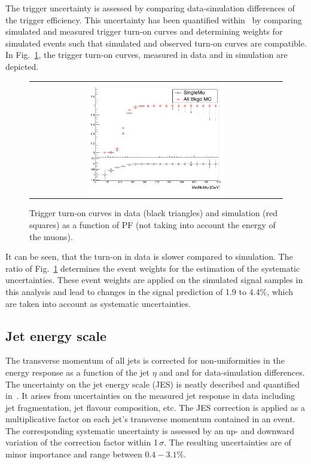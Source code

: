 The trigger uncertainty is assessed by comparing data-simulation differences of the trigger efficiency.
This uncertainty has been quantified within~\cite{bib:CMS:DT_Thesis,bib:CMS:DT_8TeV_AN} by comparing simulated and measured trigger turn-on curves and determining weights for simulated events such that simulated and observed turn-on curves are compatible.
In Fig.~\ref{fig:TriggerTurnOn}, the trigger turn-on curves, measured in data and in simulation are depicted.
\begin{figure}[!b]
  \centering 
  \begin{tabular}{c}
    \includegraphics[width=0.55\textwidth]{figures/analysis_2/Interpretation/TriggerEfficiency.png} 
  \end{tabular}
  \caption{Trigger turn-on curves in data (black triangles) and simulation (red squares) as a function of PF \met (not taking into account the energy of the muons).}
  \label{fig:TriggerTurnOn}
\end{figure} 
It can be seen, that the turn-on in data is slower compared to simulation.
The ratio of Fig.~\ref{fig:TriggerTurnOn} determines the event weights for the estimation of the systematic uncertainties.
These event weights are applied on the simulated signal samples in this analysis and lead to changes in the signal prediction of 1.9 to 4.4\%, which are taken into account as systematic uncertainties.


\subsection*{Jet energy scale}
The transverse momentum of all jets is corrected for non-uniformities in the energy response as a function of the jet $\eta$ and \pt and for data-simulation differences.
The uncertainty on the jet energy scale (JES) is neatly described and quantified in~\cite{bib:CMS:JERCPaper_InPreparation}. 
It arises from uncertainties on the measured jet response in data including jet fragmentation, jet flavour composition, etc.
The JES correction is applied as a multiplicative factor on each jet's transverse momentum contained in an event.
The corresponding systematic uncertainty is assessed by an up- and downward variation of the correction factor within 1\,$\sigma$.
The resulting uncertainties are of minor importance and range between $0.4-3.1\%$.

